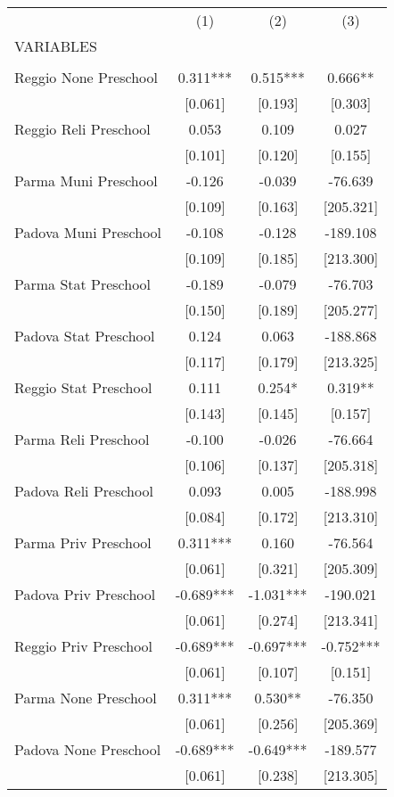 \begin{tabular}{lccc} \hline
 & (1) & (2) & (3) \\
VARIABLES &  &  &  \\ \hline
 &  &  &  \\
Reggio None Preschool & 0.311*** & 0.515*** & 0.666** \\
 & [0.061] & [0.193] & [0.303] \\
Reggio Reli Preschool & 0.053 & 0.109 & 0.027 \\
 & [0.101] & [0.120] & [0.155] \\
Parma Muni Preschool & -0.126 & -0.039 & -76.639 \\
 & [0.109] & [0.163] & [205.321] \\
Padova Muni Preschool & -0.108 & -0.128 & -189.108 \\
 & [0.109] & [0.185] & [213.300] \\
Parma Stat Preschool & -0.189 & -0.079 & -76.703 \\
 & [0.150] & [0.189] & [205.277] \\
Padova Stat Preschool & 0.124 & 0.063 & -188.868 \\
 & [0.117] & [0.179] & [213.325] \\
Reggio Stat Preschool & 0.111 & 0.254* & 0.319** \\
 & [0.143] & [0.145] & [0.157] \\
Parma Reli Preschool & -0.100 & -0.026 & -76.664 \\
 & [0.106] & [0.137] & [205.318] \\
Padova Reli Preschool & 0.093 & 0.005 & -188.998 \\
 & [0.084] & [0.172] & [213.310] \\
Parma Priv Preschool & 0.311*** & 0.160 & -76.564 \\
 & [0.061] & [0.321] & [205.309] \\
Padova Priv Preschool & -0.689*** & -1.031*** & -190.021 \\
 & [0.061] & [0.274] & [213.341] \\
Reggio Priv Preschool & -0.689*** & -0.697*** & -0.752*** \\
 & [0.061] & [0.107] & [0.151] \\
Parma None Preschool & 0.311*** & 0.530** & -76.350 \\
 & [0.061] & [0.256] & [205.369] \\
Padova None Preschool & -0.689*** & -0.649*** & -189.577 \\
 & [0.061] & [0.238] & [213.305] \\

\end{tabular}

